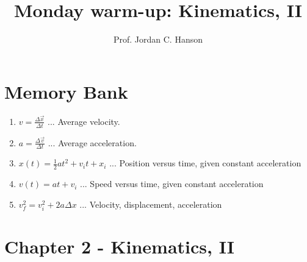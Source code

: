 \documentclass{article}
\begin{document}
\twocolumn

\title{Monday warm-up: Kinematics, II}
\author{Prof. Jordan C. Hanson}

\maketitle

\section{Memory Bank}

\begin{enumerate}
\item $v = \frac{\Delta \vec{x}}{\Delta t}$ ... Average velocity.
\item $a = \frac{\Delta \vec{v}}{\Delta t}$ ... Average acceleration.
\item $x(t) = \frac{1}{2}at^2 + v_i t + x_i$ ... Position versus time, given constant acceleration
\item $v(t) = at + v_i$ ... Speed versus time, given constant acceleration
\item $v_f^2 = v_i^2 + 2 a \Delta x$ ... Velocity, displacement, acceleration
\end{enumerate}

\section{Chapter 2 - Kinematics, II}
\end{document}
